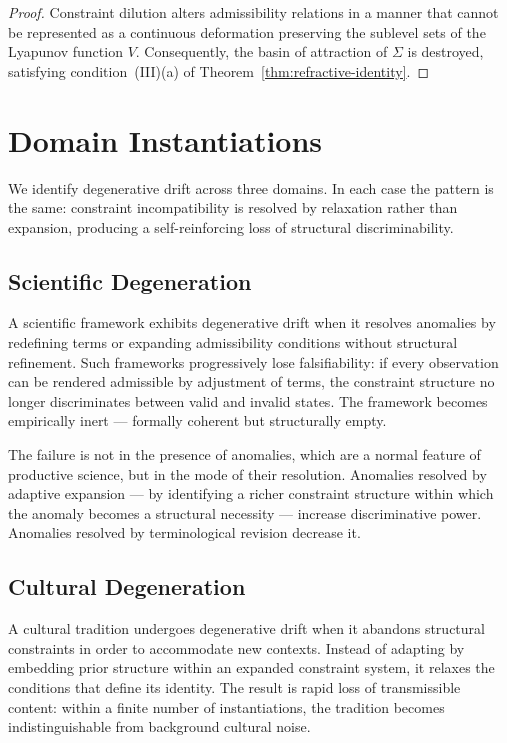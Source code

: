 \documentclass[11pt,openany]{book}
\begin{document}
\begin{proof}
Constraint dilution alters admissibility relations in a
manner that cannot be represented as a continuous
deformation preserving the sublevel sets of the Lyapunov
function $V$.  Consequently, the basin of attraction of
$\Sigma$ is destroyed, satisfying condition~(III)(a) of
Theorem~\ref{thm:refractive-identity}.
\end{proof}

\section{Domain Instantiations}
\label{sec:domains}

We identify degenerative drift across three domains.  In
each case the pattern is the same: constraint incompatibility
is resolved by relaxation rather than expansion, producing
a self-reinforcing loss of structural discriminability.

\subsection{Scientific Degeneration}
\label{subsec:scientific}

A scientific framework exhibits degenerative drift when it
resolves anomalies by redefining terms or expanding
admissibility conditions without structural refinement.
Such frameworks progressively lose falsifiability: if every
observation can be rendered admissible by adjustment of
terms, the constraint structure no longer discriminates
between valid and invalid states.  The framework becomes
empirically inert --- formally coherent but structurally
empty.

The failure is not in the presence of anomalies, which are
a normal feature of productive science, but in the mode of
their resolution.  Anomalies resolved by adaptive expansion
--- by identifying a richer constraint structure within
which the anomaly becomes a structural necessity --- increase
discriminative power.  Anomalies resolved by terminological
revision decrease it.

\subsection{Cultural Degeneration}
\label{subsec:cultural}

A cultural tradition undergoes degenerative drift when it
abandons structural constraints in order to accommodate new
contexts.  Instead of adapting by embedding prior structure
within an expanded constraint system, it relaxes the
conditions that define its identity.  The result is rapid
loss of transmissible content: within a finite number of
instantiations, the tradition becomes indistinguishable
from background cultural noise.
\end{document}
